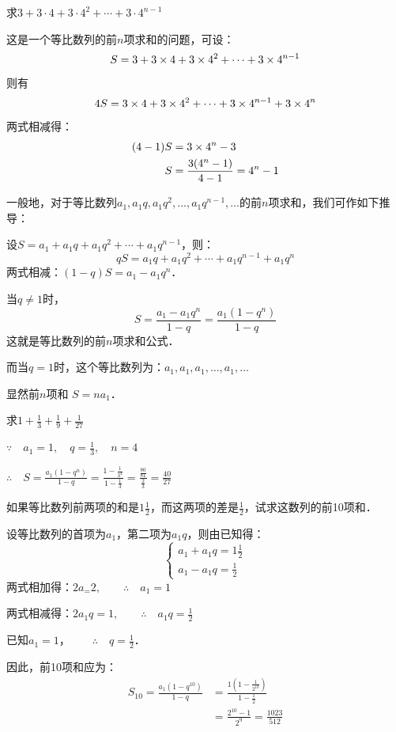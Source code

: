 \begin{example}
求$3+3\cdot 4+3\cdot 4^2+\cdots+3\cdot 4^{n-1}$
\end{example}
    
\begin{solution}
这是一个等比数列的前$n$项求和的问题，可设：$$S=3+3\times4+3\times4^2+\cdots+3\times4^{n-1}$$
则有
\[4S=3\times4+3\times4^2+\cdots+3\times4^{n-1}+3\times4^n\]
两式相减得：
\[\begin{split}
    (4-1) S&=3\times4^n-3\\
    S&=\dfrac{3(4^n-1)}{4-1}=4^n-1
\end{split}\]
\end{solution}

一般地，对于等比数列$a_1,a_1q,a_1q^2,\ldots,a_1q^{n-1},\ldots$的前$n$项求和，我们可作如下推导：

设$S=a_1+a_1q+a_1q^2+\cdots+a_1q^{n-1}$，则：
\[qS=a_1q+a_1q^2+\cdots+a_1q^{n-1}+a_1q^n\]
两式相减：$(1-q)S=a_1-a_1q^n$．

当$q\ne 1$时，
\[S=\frac{a_1-a_1q^n}{1-q}=\frac{a_1(1-q^n)}{1-q}\]
这就是等比数列的前$n$项求和公式．

而当$q=1$时，这个等比数列为：$a_1,a_1,a_1,\ldots,a_1,\ldots$

显然前$n$项和 $S=na_1$．

\begin{example}
    求$1+\frac{1}{3}+\frac{1}{9}+\frac{1}{27}$
\end{example}

\begin{solution}
    $\because\quad a_1=1,\quad q=\frac{1}{3},\quad n=4$

    $\therefore\quad S=\frac{a_1(1-q^n)}{1-q}=\frac{1-\frac{1}{3^4}}{1-\frac{1}{3}}=\frac{\frac{80}{81}}{\frac{2}{3}}=\frac{40}{27}$
\end{solution}

\begin{example}
    如果等比数列前两项的和是$1\frac{1}{2}$，而这两项的差是$\frac{1}{2}$，试求这数列的前10项和．    
\end{example}


\begin{solution}
    设等比数列的首项为$a_1$，第二项为$a_1q$，则由已知得：
    \[\begin{cases}
    a_1+a_1q=1\frac{1}{2}\\
    a_1-a_1q=\frac{1}{2}    
    \end{cases}\]
    两式相加得：$2a_=2,\qquad \therefore\quad a_1=1$

    两式相减得：$2a_1q=1,\qquad \therefore\quad a_1q=\frac{1}{2}$

    已知$a_1=1$，$\qquad \therefore\quad q=\frac{1}{2}$．

    因此，前10项和应为：
\[\begin{split}
    S_{10}=\frac{a_1(1-q^{10})}{1-q}&=\frac{1\left(1-\frac{1}{2^{10}}\right)}{1-\frac{1}{2}}\\
    &=\frac{2^{10}-1}{2^9}=\frac{1023}{512}
\end{split}\]
\end{solution}



